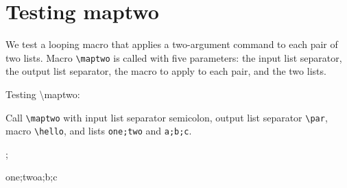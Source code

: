 \documentclass[12pt,\documentclassflag]{lawbrief}
\begin{document}
\section{Testing maptwo}

We test a looping macro that applies a two-argument command to each
pair of two lists. Macro \lstinline|\maptwo| is called with five
parameters: the input list separator, the output list separator, the
macro to apply to each pair, and the two lists.

\begin{LTXexample}
  \long{}
  \def\hello#1#2{hello #1 #2}

  Testing \textbackslash{}maptwo:

  Call \lstinline|\maptwo| with input list separator semicolon,
  output list separator \lstinline|\par|, macro \lstinline|\hello|, and lists
  \lstinline|one;two| and \lstinline|a;b;c|.
  
  \maptwo;{\par\vspace{5mm}}{\hello}{one;two}{a;b;c}
  
\end{LTXexample}
\end{document}
